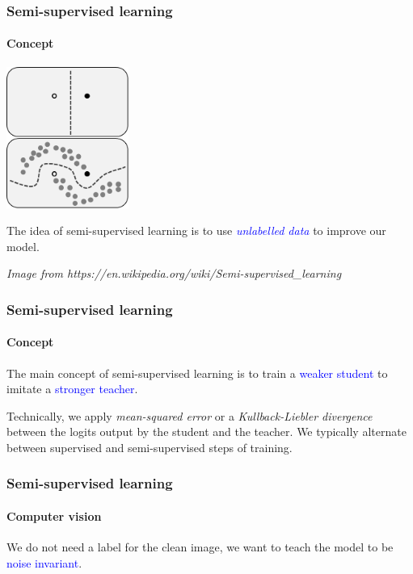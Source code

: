\documentclass[10pt]{beamer}
\begin{document}
\begin{frame}

  \frametitle{Semi-supervised learning}

  \framesubtitle{Concept}

  \begin{center}
    \includegraphics[width=4cm]{images/semi_supervised_learning.png}
  \end{center}

  \bigskip

  The idea of semi-supervised learning is to use
  \textcolor{blue}{\emph{unlabelled data}} to improve our model.

  \bigskip

  {\scriptsize \textit{Image from https://en.wikipedia.org/wiki/Semi-supervised\_learning}}
\end{frame}

\begin{frame}

  \frametitle{Semi-supervised learning}

  \framesubtitle{Concept}

  The main concept of semi-supervised learning is to train a
  \textcolor{blue}{weaker student} to imitate a
  \textcolor{blue}{stronger teacher}.

  \bigskip

  Technically, we apply \emph{mean-squared error} or a
  \emph{Kullback-Liebler divergence} between the logits output by the
  student and the teacher. We typically alternate between supervised
  and semi-supervised steps of training.

\end{frame}

\begin{frame}
  \frametitle{Semi-supervised learning}

  \framesubtitle{Computer vision}

  \begin{center}
    
  \end{center}

  \bigskip

  We do not need a label for the clean image, we want to teach the
  model to be \textcolor{blue}{noise invariant}.

\end{frame}
\end{document}
